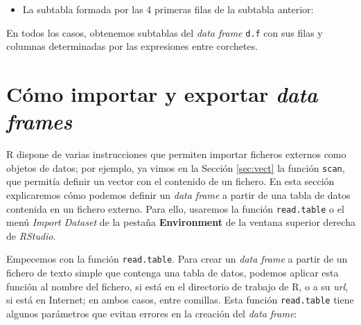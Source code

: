 \documentclass[
]{book}
\newenvironment{Shaded}{\begin{snugshade}}{\end{snugshade}}
\newcommand{\CommentTok}[1]{\textcolor[rgb]{0.56,0.35,0.01}{\textit{#1}}}
\newcommand{\DecValTok}[1]{\textcolor[rgb]{0.00,0.00,0.81}{#1}}
\newcommand{\NormalTok}[1]{#1}
\newcommand{\OperatorTok}[1]{\textcolor[rgb]{0.81,0.36,0.00}{\textbf{#1}}}
\newcommand{\StringTok}[1]{\textcolor[rgb]{0.31,0.60,0.02}{#1}}
\providecommand{\tightlist}{%
  \setlength{\itemsep}{0pt}\setlength{\parskip}{0pt}}
\theoremstyle{definition}
\theoremstyle{definition}
\theoremstyle{definition}
\theoremstyle{remark}
\begin{document}
\begin{itemize}
\tightlist
\item
  La subtabla formada por las 4 primeras filas de la subtabla anterior:
\end{itemize}

\begin{Shaded}
\end{Shaded}

En todos los casos, obtenemos subtablas del \emph{data frame} \texttt{d.f} con sus filas y columnas determinadas por las expresiones entre corchetes.

\hypertarget{cuxf3mo-importar-y-exportar-data-frames}{%
\section{\texorpdfstring{Cómo importar y exportar \emph{data frames}}{Cómo importar y exportar data frames}}\label{cuxf3mo-importar-y-exportar-data-frames}}

R dispone de varias instrucciones que permiten importar ficheros externos como objetos de datos; por ejemplo, ya vimos en la Sección \ref{sec:vect} la función \texttt{scan}, que permitía definir un vector con el contenido de un fichero. En esta sección explicaremos cómo podemos definir un \emph{data frame} a partir de una tabla de datos contenida en un fichero externo. Para ello, usaremos la función \texttt{read.table} o el menú \emph{Import Dataset} de la pestaña \textbf{Environment} de la ventana superior derecha de \emph{RStudio}.

Empecemos con la función \texttt{read.table}. Para crear un \emph{data frame} a partir de un fichero de texto simple que contenga una tabla de datos, podemos aplicar esta función al nombre del fichero, si está en el directorio de trabajo de R, o a su \emph{url}, si está en Internet; en ambos casos, entre comillas. Esta función \texttt{read.table} tiene algunos parámetros que evitan errores en la creación del \emph{data frame}:
\end{document}
